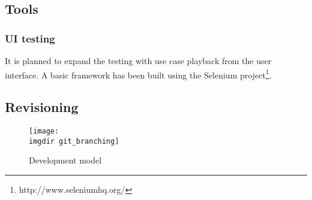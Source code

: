 \subsection{Tools}


\subsubsection{UI testing}
It is planned to expand the testing with use case playback from the user interface. A basic framework has been built using the Selenium project\footnote{http://www.seleniumhq.org/}.

\subsection{Revisioning}
\begin{figure}[ht]
\centering
\texttt{[image: \\imgdir git\_branching]}
\caption{Development model}
\label{fig:git_branching}
\end{figure}





